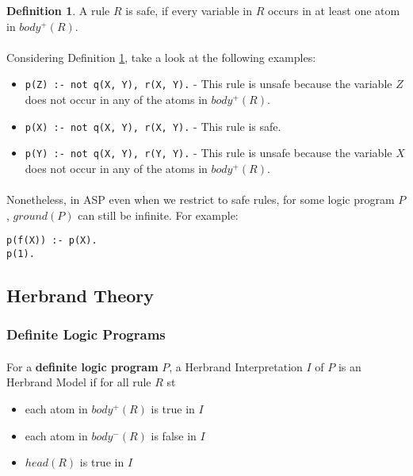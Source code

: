 \documentclass{article}
\theoremstyle{plain}
\theoremstyle{definition}
\newtheorem{defn}[thm]{Definition} %
\begin{document}
\begin{multicols}{2}
\begin{defn}\label{defn:SafeRule}
A rule $R$ is safe, if every variable in $R$ occurs in at least one atom in $body^+(R)$. 
\end{defn}

\paragraph{} Considering Definition \ref{defn:SafeRule}, take a look at the following examples:

\begin{itemize}
\item \lstinline{p(Z) :- not q(X, Y), r(X, Y).} - This rule is unsafe because the variable $Z$ does not occur in any of the atoms in $body^+(R)$.
\item \lstinline{p(X) :- not q(X, Y), r(X, Y).} - This rule is safe.
\item \lstinline{p(Y) :- not q(X, Y), r(Y, Y).} - This rule is unsafe because the variable $X$ does not occur in any of the atoms in $body^+(R)$.
\end{itemize}

\paragraph{} Nonetheless, in ASP even when we restrict to safe rules, for some logic program $P$, $ground(P)$ can still be infinite. For example:

\begin{lstlisting}
p(f(X)) :- p(X).
p(1).
\end{lstlisting}

\subsection{Herbrand Theory}

\subsubsection{Definite Logic Programs}

\paragraph{} For a \textbf{definite logic program} $P$, a Herbrand Interpretation $I$ of $P$ is an Herbrand Model if for all rule $R$ st

\begin{itemize}
\item each atom in $body^+(R)$ is true in $I$
\item each atom in $body^-(R)$ is false in $I$
\item $head(R)$ is true in $I$
\end{itemize}


\end{multicols}
\end{document}
